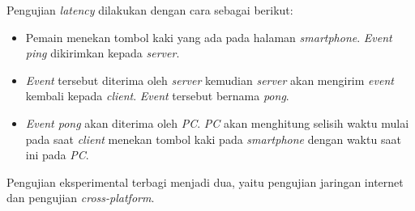 Pengujian \textit{latency} dilakukan dengan cara sebagai berikut:

\begin{itemize}
	\item Pemain menekan tombol kaki yang ada pada halaman \textit{smartphone}. \textit{Event ping} dikirimkan kepada \textit{server}.
	
	\item \textit{Event} tersebut diterima oleh \textit{server} kemudian \textit{server} akan mengirim \textit{event} kembali kepada \textit{client}. \textit{Event} tersebut bernama \textit{pong}.
	
	\item \textit{Event pong} akan diterima oleh \textit{PC}. \textit{PC} akan menghitung selisih waktu mulai pada saat \textit{client} menekan tombol kaki pada \textit{smartphone} dengan waktu saat ini pada \textit{PC}.
\end{itemize}

Pengujian eksperimental terbagi menjadi dua, yaitu pengujian jaringan internet dan pengujian \textit{cross-platform}.

